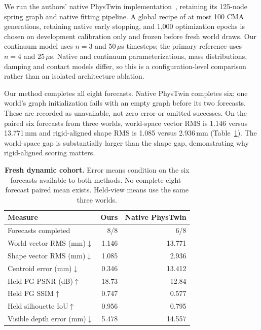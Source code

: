 \documentclass[10pt,twocolumn,letterpaper]{article}
\begin{document}
We run the authors' native PhysTwin implementation~\cite{jiang2025phystwin}, retaining its 125-node spring graph and native fitting pipeline. A global recipe of at most 100 CMA generations, retaining native early stopping, and 1,000 optimization epochs is chosen on development calibration only and frozen before fresh world draws. Our continuum model uses $n=3$ and 50\,$\mu$s timesteps; the primary reference uses $n=4$ and 25\,$\mu$s. Native and continuum parameterizations, mass distributions, damping and contact models differ, so this is a configuration-level comparison rather than an isolated architecture ablation.

Our method completes all eight forecasts. Native PhysTwin completes six; one world's graph initialization fails with an empty graph before its two forecasts. These are recorded as unavailable, not zero error or omitted successes. On the paired six forecasts from three worlds, world-space vector RMS is 1.146 versus 13.771\,mm and rigid-aligned shape RMS is 1.085 versus 2.936\,mm (Table~\ref{tab:dynamic}). The world-space gap is substantially larger than the shape gap, demonstrating why rigid-aligned scoring matters.

\begin{table}[t]
\centering\small
\caption{\textbf{Fresh dynamic cohort.} Error means condition on the six forecasts available to both methods. No complete eight-forecast paired mean exists. Held-view means use the same three worlds.}
\label{tab:dynamic}
\begin{tabular}{lrr}\toprule
Measure & Ours & Native PhysTwin\\\midrule
Forecasts completed & 8/8 & 6/8\\
World vector RMS (mm)$\downarrow$ & 1.146 & 13.771\\
Shape vector RMS (mm)$\downarrow$ & 1.085 & 2.936\\
Centroid error (mm)$\downarrow$ & 0.346 & 13.412\\\midrule
Held FG PSNR (dB)$\uparrow$ & 18.73 & 12.84\\
Held FG SSIM$\uparrow$ & 0.747 & 0.577\\
Held silhouette IoU$\uparrow$ & 0.956 & 0.795\\
Visible depth error (mm)$\downarrow$ & 5.478 & 14.557\\\bottomrule
\end{tabular}
\end{table}
\end{document}
